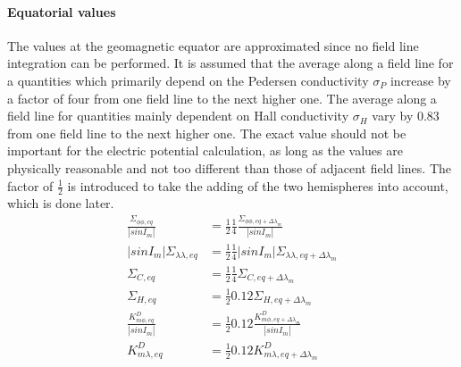 \paragraph{Equatorial values}
%
The values at the geomagnetic equator are approximated since no field line
integration can be performed. It is assumed that the average along a field line 
for a quantities which primarily
depend on the Pedersen conductivity $\sigma_{P}$ increase by a factor of four
from one field
line to the next higher one. The average along a field line for quantities
mainly dependent on Hall conductivity $\sigma_{H}$ 
vary by 0.83 from one field line to the next higher one. The exact value should
not be important for the electric potential calculation, as long as the values
are physically reasonable and not too different than those of adjacent field
lines. The factor of $\frac{1}{2}$ is introduced to take the adding of the two
hemispheres into account, which is done later.
%
\begin{align}
  \frac{\Sigma_{\phi \phi, eq}}{|sinI_m|} &= 
       \frac{1}{2}\frac{1}{4}\frac{\Sigma_{\phi \phi, eq+\Delta \lambda_m}}{|sinI_m|} \\
  {|sinI_m|}{\Sigma_{\lambda \lambda, eq}} &=  
       \frac{1}{2}\frac{1}{4}{|sinI_m|}{\Sigma_{\lambda \lambda, eq+\Delta \lambda_m}} \\
  {\Sigma_{C, eq}} &=  
       \frac{1}{2}\frac{1}{4}{\Sigma_{C, eq+\Delta \lambda_m}} \\
  {\Sigma_{H, eq}} &=  
       \frac{1}{2} 0.12 {\Sigma_{H, eq+\Delta \lambda_m}}\\
  \frac{K_{m \phi, eq}^D}{|sinI_m|} &=  
       \frac{1}{2} 0.12\frac{K_{m \phi, eq+ \Delta \lambda_m}^D}{|sinI_m|}\\
  K_{m \lambda, eq}^D &=  
       \frac{1}{2} 0.12 K_{m \lambda,eq+\Delta \lambda_m }^D
\end{align}
%
%
